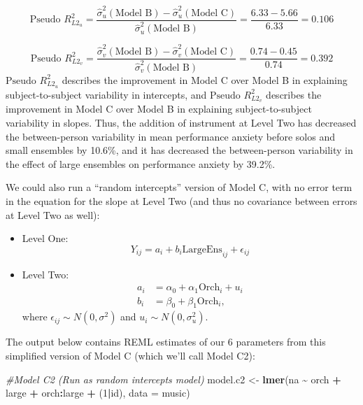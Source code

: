 \documentclass[
]{krantz}
\newenvironment{Shaded}{\begin{snugshade}}{\end{snugshade}}
\newcommand{\AttributeTok}[1]{\textcolor[rgb]{0.27,0.27,0.27}{#1}}
\newcommand{\CommentTok}[1]{\textcolor[rgb]{0.37,0.37,0.37}{\textit{#1}}}
\newcommand{\DecValTok}[1]{\textcolor[rgb]{0.06,0.06,0.06}{#1}}
\newcommand{\FunctionTok}[1]{\textcolor[rgb]{0.27,0.27,0.27}{\textbf{#1}}}
\newcommand{\NormalTok}[1]{#1}
\newcommand{\OtherTok}[1]{\textcolor[rgb]{0.37,0.37,0.37}{#1}}
\newcommand{\SpecialCharTok}[1]{\textcolor[rgb]{0.43,0.43,0.43}{\textbf{#1}}}
\begin{document}
\begin{equation*}
\textrm{Pseudo }R^2_{L2_u} = \frac{\hat{\sigma}_{u}^{2}(\textrm{Model B})-\hat{\sigma}_{u}^{2}(\textrm{Model C})}{\hat{\sigma}_{u}^{2}(\textrm{Model B})} = \frac{6.33-5.66}{6.33} = 0.106
\end{equation*}

\begin{equation*}
\textrm{Pseudo }R^2_{L2_v} = \frac{\hat{\sigma}_{v}^{2}(\textrm{Model B})-\hat{\sigma}_{v}^{2}(\textrm{Model C})}{\hat{\sigma}_{v}^{2}(\textrm{Model B})} = \frac{0.74-0.45}{0.74} = 0.392
\end{equation*}
\(\textrm{Pseudo }R^2_{L2_u}\) describes the improvement in Model C over Model B in explaining subject-to-subject variability in intercepts, and \(\textrm{Pseudo }R^2_{L2_v}\) describes the improvement in Model C over Model B in explaining subject-to-subject variability in slopes. Thus, the addition of instrument at Level Two has decreased the between-person variability in mean performance anxiety before solos and small ensembles by 10.6\%, and it has decreased the between-person variability in the effect of large ensembles on performance anxiety by 39.2\%.

We could also run a ``random intercepts'' version of Model C, with no error term in the equation for the slope at Level Two (and thus no covariance between errors at Level Two as well):

\begin{itemize}
\item
  Level One:
  \begin{equation*}
  Y_{ij} = a_{i}+b_{i}\textrm{LargeEns}_{ij}+\epsilon_{ij}
  \end{equation*}
\item
  Level Two:
  \begin{align*}
  a_{i} & = \alpha_{0}+\alpha_{1}\textrm{Orch}_{i}+u_{i} \\
  b_{i} & = \beta_{0}+\beta_{1}\textrm{Orch}_{i},
  \end{align*}
  where \(\epsilon_{ij}\sim N(0,\sigma^2)\) and \(u_{i}\sim N(0,\sigma_{u}^{2})\).
\end{itemize}

The output below contains REML estimates of our 6 parameters from this simplified version of Model C (which we'll call Model C2):

\begin{Shaded}
\begin{Highlighting}[]
\CommentTok{\#Model C2 (Run as random intercepts model)}
\NormalTok{model.c2 }\OtherTok{\textless{}{-}} \FunctionTok{lmer}\NormalTok{(na }\SpecialCharTok{\textasciitilde{}}\NormalTok{ orch }\SpecialCharTok{+}\NormalTok{ large }\SpecialCharTok{+}\NormalTok{ orch}\SpecialCharTok{:}\NormalTok{large }\SpecialCharTok{+}
\NormalTok{  (}\DecValTok{1}\SpecialCharTok{|}\NormalTok{id), }\AttributeTok{data =}\NormalTok{ music)}
\end{Highlighting}
\end{Shaded}
\end{document}
